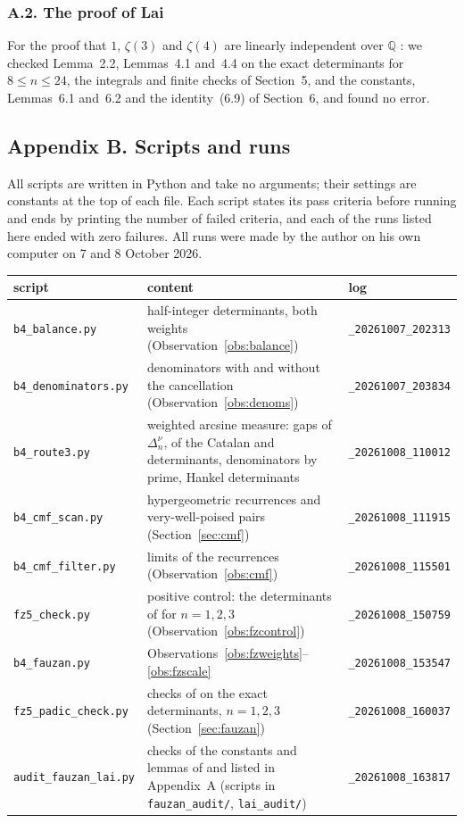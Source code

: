 \documentclass[11pt]{article}
\theoremstyle{definition}
\begin{document}
\subsubsection*{A.2. The proof of Lai}

For the proof that $1$, $\zeta(3)$ and $\zeta(4)$ are linearly independent over $\mathbb Q$ \cite{Lai}: we checked Lemma~2.2, Lemmas~4.1 and~4.4 on the exact determinants for $8\le n\le24$, the integrals and finite checks of Section~5, and the constants, Lemmas~6.1 and~6.2 and the identity~(6.9) of Section~6, and found no error.


\subsection*{Appendix B. Scripts and runs}

All scripts are written in Python and take no arguments; their settings are constants at the top of each file. Each script states its pass criteria before running and ends by printing the number of failed criteria, and each of the runs listed here ended with zero failures. All runs were made by the author on his own computer on 7 and 8 October 2026.

\begin{center}
\small
\begin{tabular}{p{4.2cm}p{7.2cm}p{3.6cm}}
\toprule
script & content & log\\
\midrule
\texttt{b4\_balance.py} & half-integer determinants, both weights (Observation~\ref{obs:balance}) & \texttt{\_20261007\_202313}\\
\texttt{b4\_denominators.py} & denominators with and without the cancellation (Observation~\ref{obs:denoms}) & \texttt{\_20261007\_203834}\\
\texttt{b4\_route3.py} & weighted arcsine measure: gaps of $\Delta^\nu_n$, of the Catalan and \cite{OAI} determinants, denominators by prime, Hankel determinants & \texttt{\_20261008\_110012}\\
\texttt{b4\_cmf\_scan.py} & hypergeometric recurrences and very-well-poised pairs (Section~\ref{sec:cmf}) & \texttt{\_20261008\_111915}\\
\texttt{b4\_cmf\_filter.py} & limits of the recurrences (Observation~\ref{obs:cmf}) & \texttt{\_20261008\_115501}\\
\texttt{fz5\_check.py} & positive control: the determinants of \cite{Fauzan} for $n=1,2,3$ (Observation~\ref{obs:fzcontrol}) & \texttt{\_20261008\_150759}\\
\texttt{b4\_fauzan.py} & Observations~\ref{obs:fzweights}--\ref{obs:fzscale} & \texttt{\_20261008\_153547}\\
\texttt{fz5\_padic\_check.py} & checks of \cite[(3.12), Proposition~4.3]{Fauzan} on the exact determinants, $n=1,2,3$ (Section~\ref{sec:fauzan}) & \texttt{\_20261008\_160037}\\
\texttt{audit\_fauzan\_lai.py} & checks of the constants and lemmas of \cite{Fauzan} and \cite{Lai} listed in Appendix~A (scripts in \texttt{fauzan\_audit/}, \texttt{lai\_audit/}) & \texttt{\_20261008\_163817}\\
\bottomrule
\end{tabular}
\end{center}
\end{document}
